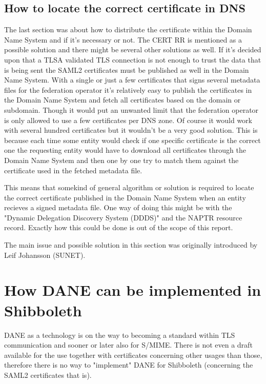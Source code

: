 \subsection{How to locate the correct certificate in DNS}
\label{subsec:matching-dilemma}
The last section was about how to distribute the certificate within the Domain Name System and if it's necessary or not.
The CERT RR is mentioned as a possible solution and there might be several other solutions as well.
If it's decided upon that a TLSA validated TLS connection is not enough to trust the data that is being sent the SAML2 certificates must be published as well in the Domain Name System.
With a single or just a few certificates that signs several metadata files for the federation operator it's relatively easy to publish the certificates in the Domain Name System and fetch all certificates based on the domain or subdomain.
Though it would put an unwanted limit that the federation operator is only allowed to use a few certificates per DNS zone.
Of course it would work with several hundred certificates but it wouldn't be a very good solution.
This is because each time some entity would check if one specific certificate is the correct one the requesting entity would have to download all certificates through the Domain Name System and then one by one try to match them against the certificate used in the fetched metadata file.

This means that somekind of general algorithm or solution is required to locate the correct certificate published in the Domain Name System when an entity recieves a signed metadata file.
One way of doing this might be with the "Dynamic Delegation Discovery System (DDDS)"\cite{rfc:3401,rfc:3402,rfc:3403,rfc:3404} and the NAPTR resource record\cite{rfc:3403}.
Exactly how this could be done is out of the scope of this report.

The main issue and possible solution in this section was originally introduced by Leif Johansson (SUNET).

\section{How DANE can be implemented in Shibboleth} 
DANE as a technology is on the way to becoming a standard within TLS communication and sooner or later also for S/MIME.
There is not even a draft available for the use together with certificates concerning other usages than those, therefore there is no way to "implement" DANE for Shibboleth (concerning the SAML2 certificates that is).

